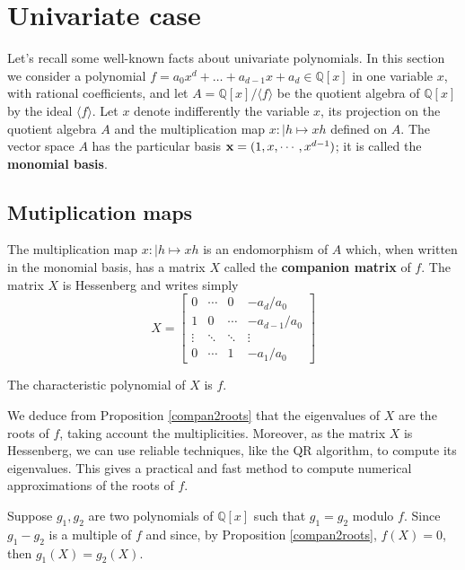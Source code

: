 \documentclass{standalone}
\begin{document}
\section{Univariate case}
\label{univariate}
Let's recall some well-known facts about univariate polynomials. 
In this section we consider a polynomial $f = a_0x^d + \dots + a_{d-1}x + a_d \in \mathbb{Q}[x]$ in one variable $x$, with rational coefficients, and let $A = \mathbb{Q}[x]/\langle f \rangle$ be the quotient algebra of $\mathbb{Q}[x]$ by the ideal $\langle f \rangle$.
Let $x$ denote indifferently the variable $x$, its projection on the quotient algebra $A$ and the multiplication map $x : \left\vert h \mapsto xh \right.$ defined on $A$. 
The vector space $A$ has the particular basis $\bold{x} = (1, x,\cdots, x^{d-1})$; it is called the {\bf monomial basis}.

\subsection{Mutiplication maps}
The multiplication map $x : \left\vert h \mapsto xh \right.$ is an endomorphism of $A$ which, when written in the monomial basis, has a matrix $X$ called the {\bf companion matrix} of $f$. 
The matrix $X$ is Hessenberg and writes simply
\begin{equation}
\label{compan}
X =
\begin{bmatrix}
	0 & \cdots & 0 & -a_d/a_0 \\
	1 & 0 & \cdots & -a_{d-1}/a_0 \\
	\vdots  & \ddots  & \ddots & \vdots  \\
	0 & \cdots & 1 & -a_1/a_0
\end{bmatrix}
\end{equation}
\begin{prop}
\label{compan2roots}
The characteristic polynomial of $X$ is $f$.
\end{prop}

\begin{rem}
We deduce from Proposition \ref{compan2roots} that the eigenvalues of $X$ are the roots of $f$, taking account the multiplicities. 
Moreover, as the matrix $X$ is Hessenberg, we can use reliable techniques, like the QR algorithm, to compute its eigenvalues. 
This gives a practical and fast method to compute numerical approximations of the roots of $f$. 
\end{rem}

\begin{rem}
\label{g_1=g_2}
Suppose $g_1, g_2$ are two polynomials of $\mathbb{Q}[x]$ such that $g_1 = g_2$ modulo $f$. 
Since $g_1-g_2$ is a multiple of $f$ and since, by Proposition \ref{compan2roots}, $f(X) = 0$, then $g_1(X) = g_2(X)$.
\end{rem}
\end{document}
